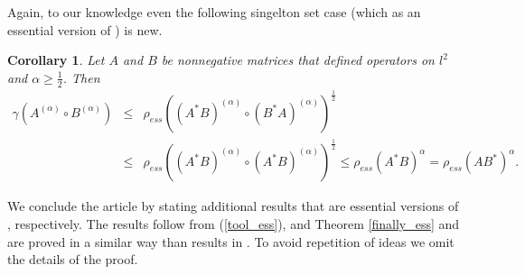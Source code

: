 \documentclass[12pt, reqno]{amsart}
\newtheorem{corollary}[theorem]{Corollary}
\theoremstyle{definition}
\theoremstyle{remark}
\numberwithin{equation}{section}
\begin{document}
Again, to our  knowledge even the following singelton set case (which as an essential version of \cite[Theorem 4.4, (4.9)]{P17+}) is new. 
\begin{corollary} Let $A$ and $B$ be nonnegative matrices that defined  operators on $l^2$  and $\alpha \ge \frac{1}{2}$. Then
\begin{eqnarray}
\nonumber
\gamma (A^{(\alpha)} \circ  B^{(\alpha)} ) &\le&\rho _{ess}  \left ( (A^* B) ^{(\alpha)}\circ (B^* A)^{(\alpha)}\right)^{\frac{1}{2}} \\
\nonumber
&\le&\rho _{ess}  \left ( (A^* B) ^{(\alpha)}\circ (A^* B)^{(\alpha)}\right)^{\frac{1}{2}}
\le \rho _{ess}  (A^* B ) ^{\alpha}=
\rho _{ess}  \left (A B^* \right)^{\alpha}  .%
\end{eqnarray}
\end{corollary}
We conclude the article by stating additional results that are essential versions of \cite[Theorems 3.5 and 3.6, Corollary 3.7, Theorems 3.8, 3.11 and 3.13, Corollary 3.15]{B23+}, respectively. The results follow from (\ref{tool_ess}), %
 \cite[Theorem 3.2(i)]{BP22b} and Theorem \ref{finally_ess} and are proved in a similar way than results in \cite{B23+}. To avoid repetition of ideas we omit the details of the proof.
\end{document}
